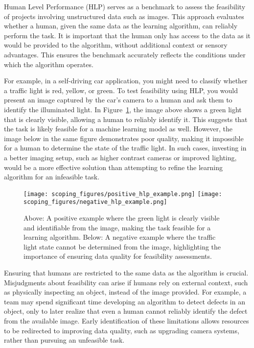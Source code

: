 \documentclass[12pt,openany]{book}
\begin{document}
Human Level Performance (HLP) serves as a benchmark to assess the feasibility of projects involving unstructured data such as images. This approach evaluates whether a human, given the same data as the learning algorithm, can reliably perform the task. It is important that the human only has access to the data as it would be provided to the algorithm, without additional context or sensory advantages. This ensures the benchmark accurately reflects the conditions under which the algorithm operates. \newline

For example, in a self-driving car application, you might need to classify whether a traffic light is red, yellow, or green. To test feasibility using HLP, you would present an image captured by the car's camera to a human and ask them to identify the illuminated light. In Figure~\ref{fig:hlp_examples}, the image above shows a green light that is clearly visible, allowing a human to reliably identify it. This suggests that the task is likely feasible for a machine learning model as well. However, the image below in the same figure demonstrates poor quality, making it impossible for a human to determine the state of the traffic light. In such cases, investing in a better imaging setup, such as higher contrast cameras or improved lighting, would be a more effective solution than attempting to refine the learning algorithm for an infeasible task. \newline

\begin{figure}[H]
    \centering
    \texttt{[image: scoping\_figures/positive\_hlp\_example.png]}
    \vspace{0.5cm} %
    \texttt{[image: scoping\_figures/negative\_hlp\_example.png]}
    \caption{Above: A positive example where the green light is clearly visible and identifiable from the image, making the task feasible for a learning algorithm. Below: A negative example where the traffic light state cannot be determined from the image, highlighting the importance of ensuring data quality for feasibility assessments.}
    \label{fig:hlp_examples}
\end{figure}

Ensuring that humans are restricted to the same data as the algorithm is crucial. Misjudgments about feasibility can arise if humans rely on external context, such as physically inspecting an object, instead of the image provided. For example, a team may spend significant time developing an algorithm to detect defects in an object, only to later realize that even a human cannot reliably identify the defect from the available image. Early identification of these limitations allows resources to be redirected to improving data quality, such as upgrading camera systems, rather than pursuing an unfeasible task. \newline
\end{document}
